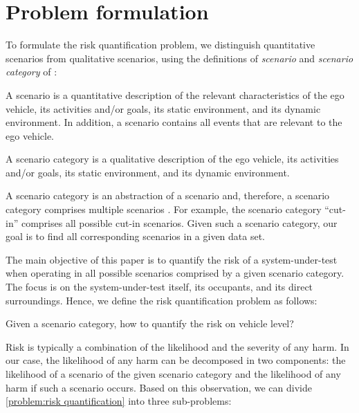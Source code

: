 \section{Problem formulation}
\label{sec:problem}

To formulate the risk quantification problem, we distinguish quantitative scenarios from qualitative scenarios, using the definitions of \emph{scenario} and \emph{scenario category} of \autocite{degelder2018ontology}:

\begin{definition}[Scenario]
	\label{def:scenario}
	A scenario is a quantitative description of the relevant characteristics of the ego vehicle, its activities and/or goals, its static environment, and its dynamic environment. In addition, a scenario contains all events that are relevant to the ego vehicle.
\end{definition}

\begin{definition}
	\label{def:scenario category}
	A scenario category is a qualitative description of the ego vehicle, its activities and/or goals, its static environment, and its dynamic environment.
\end{definition}

A scenario category is an abstraction of a scenario and, therefore, a scenario category comprises multiple scenarios \autocite{degelder2018ontology}.
For example, the scenario category ``cut-in'' comprises all possible cut-in scenarios. 
Given such a scenario category, our goal is to find all corresponding scenarios in a given data set. 

The main objective of this paper is to quantify the risk of a system-under-test when operating in all possible scenarios comprised by a given scenario category. The focus is on the system-under-test itself, its occupants, and its direct surroundings. Hence, we define the risk quantification problem as follows:

\begin{problem}
	\label{problem:risk quantification}
	Given a scenario category, how to quantify the risk on vehicle level?
\end{problem}

Risk is typically a combination of the likelihood and the severity of any harm. In our case, the likelihood of any harm can be decomposed in two components: the likelihood of a scenario of the given scenario category and the likelihood of any harm if such a scenario occurs. Based on this observation, we can divide \cref{problem:risk quantification} into three sub-problems:


